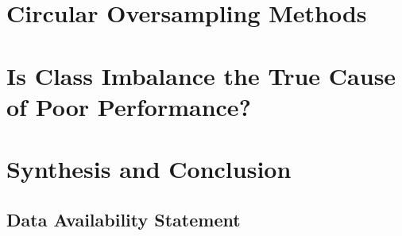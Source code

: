 \documentclass[12pt, a4paper, twoside, openright]{book}
\theoremstyle{plain}
\theoremstyle{definition}
\begin{document}


\part{Circular Oversampling Methods}
\label{part:circular_oversampling}











\part{Is Class Imbalance the True Cause of Poor Performance?}
\label{part:causality}











\part{Synthesis and Conclusion}
\label{part:conclusion}



\cleardoublepage
\chapter*{Data Availability Statement}
\end{document}
